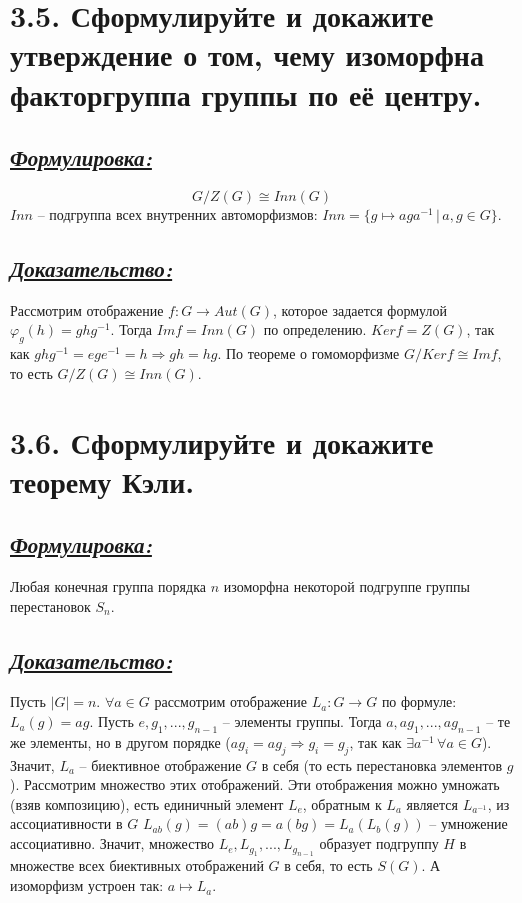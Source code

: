\documentclass{article}
\begin{document}
\section*{\LARGE 3.5. Сформулируйте и докажите утверждение о том, чему изоморфна факторгруппа группы по её центру. }
\subsection*{\Large \underline{\textit{Формулировка: }}}
$$G/Z(G) \cong Inn(G)$$
$Inn$ -- подгруппа всех внутренних автоморфизмов: $Inn = \{g \mapsto aga^{-1}\,|\, a,g \in G\}$.

\subsection*{\Large \underline{\textit{Доказательство:}}}
Рассмотрим отображение $f : G \rightarrow Aut(G)$, которое задается формулой 
\newline $\varphi_g(h) = ghg^{-1}$. Тогда $Imf = Inn(G)$ по определению. $Kerf = Z(G)$, так как $ghg^{-1} = ege^{-1} = h \Rightarrow gh = hg$. По теореме о гомоморфизме $G / Kerf \cong Imf$, то есть $G / Z(G) \cong Inn(G)$. 

\section*{\LARGE 3.6. Сформулируйте и докажите теорему Кэли. }
\subsection*{\Large \underline{\textit{Формулировка: }}}
Любая конечная группа порядка $n$ изоморфна некоторой подгруппе группы перестановок $S_n$.

\subsection*{\Large \underline{\textit{Доказательство:} }}
Пусть $|G| = n$. $\forall a \in G$ рассмотрим отображение $L_a : G \rightarrow G$ по формуле: $L_a(g) = ag$.
\newline Пусть $e, g_1, ..., g_{n-1}$ -- элементы группы. Тогда $a, ag_1, ..., ag_{n - 1}$ -- те же элементы, но в другом порядке ($ag_i = ag_j \Rightarrow g_i = g_j$, так как $\exists a^{-1}\,\forall a \in G$). Значит, $L_a$ -- биективное отображение $G$ в себя (то есть перестановка элементов $g$). Рассмотрим множество этих отображений. Эти отображения можно умножать (взяв композицию), есть единичный элемент $L_e$, обратным к $L_a$ является $L_{a^{-1}}$, из ассоциативности в $G$ $L_{ab}(g) = (ab)g = a(bg) = L_a(L_b(g))$ -- умножение ассоциативно. Значит, множество $L_e, L_{g_1}, ..., L_{g_{n-1}}$ образует подгруппу $H$ в множестве всех биективных отображений $G$ в себя, то есть $S(G)$. А изоморфизм устроен так: $a \mapsto L_a$.
\end{document}
